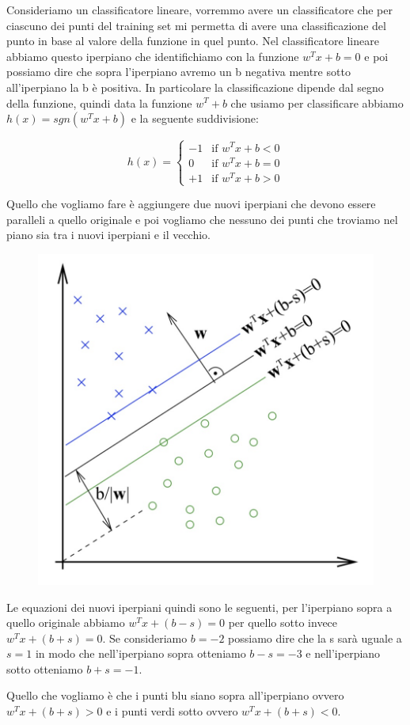 \documentclass[14pt]{extreport}
\begin{document}
Consideriamo un classificatore lineare, vorremmo avere un classificatore che per ciascuno dei punti del training set mi permetta di avere una
classificazione del punto in base al valore della funzione in quel punto. Nel classificatore lineare abbiamo questo iperpiano che identifichiamo con
la funzione $w^Tx+b=0$ e poi possiamo dire che sopra l'iperpiano avremo un b negativa mentre sotto all'iperpiano la b è positiva. In particolare la
classificazione dipende dal segno della funzione, quindi data la funzione $w^T +b$ che usiamo per classificare abbiamo $h(x) = sgn(w^Tx+b)$ e la
seguente suddivisione:


\begin{equation}
 h(x)=
 \begin{cases}
  -1 & \text{if $w^Tx+b < 0$}    \\
  0 & \text{if $w^Tx+b = 0$} \\
  +1 & \text{if $w^Tx+b > 0$}
 \end{cases}
\label{eq4}
\end{equation}


Quello che vogliamo fare è aggiungere due nuovi iperpiani che devono essere paralleli a quello originale e poi vogliamo che nessuno dei punti che
troviamo nel piano sia tra i nuovi iperpiani e il vecchio.

\begin{figure}[H]
\centering
\includegraphics[width=0.5\linewidth]{314.jpeg}
\end{figure}

Le equazioni dei nuovi iperpiani quindi sono le seguenti, per l'iperpiano sopra a quello originale abbiamo $w^Tx+(b-s)=0$ per quello sotto invece
$w^Tx+(b+s)=0$. Se consideriamo $b=-2$ possiamo dire che la s sarà uguale a $s=1$ in modo che nell'iperpiano sopra otteniamo $b-s=-3$ e nell'iperpiano sotto
otteniamo $b+s = -1$.

Quello che vogliamo è che i punti blu siano sopra all'iperpiano ovvero $w^Tx+(b+s)>0$ e i punti verdi sotto ovvero $w^Tx+(b+s)<0$.
\end{document}
